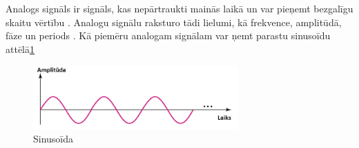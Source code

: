 \documentclass[12pt,paper=A4]{report}
\begin{document}
Analogs signāls ir signāls, kas nepārtraukti mainās laikā un var pieņemt bezgalīgu skaitu vērtību \cite{http://ecomputernotes.com/computernetworkingnotes/communication-networks/analog-signal}. Analogu signālu raksturo tādi lielumi, kā frekvence, amplitūdā, fāze un periods \cite{http://computerrelatedinfo.blogspot.com/2012/12/what-is-analog-signal-its-properties.html}. Kā piemēru analogam signālam var ņemt parastu sinusoīdu attēlā\ref{sinusoida}

\begin{figure}[H] \centering
\includegraphics[width=0.70\textwidth]{sin} 
\caption{Sinusoīda \cite{properties}}  \label{sinusoida} 
\end{figure}
\end{document}
